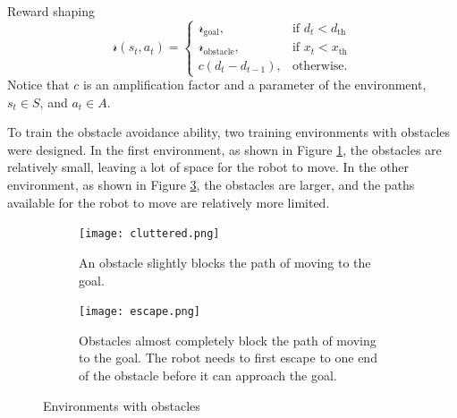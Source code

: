 {Reward shaping
\begin{equation*}
    \mathcal{r}(s_t, a_t) = \begin{cases}
    \mathcal{r}_\text{goal}, &\text{if $d_t < d_\text{th}$}\\
    \mathcal{r}_\text{obstacle}, &\text{if $x_t < x_\text{th}$}\\
    c (d_t - d_{t-1}), &\text{otherwise.}
    \end{cases}
\end{equation*}
Notice that $c$ is an amplification factor and a parameter of the environment, $s_t \in S$, and $a_t \in A$.

To train the obstacle avoidance ability, two training environments with obstacles were designed. In the first environment, as shown in Figure \ref{fig:cluttered}, the obstacles are relatively small, leaving a lot of space for the robot to move. In the other environment, as shown in Figure \ref{fig:escape}, the obstacles are larger, and the paths available for the robot to move are relatively more limited.

\begin{figure}[htbp]
\centering
\begin{subfigure}[b]{0.49\textwidth}
   \centering
   \texttt{[image: cluttered.png]}
   \caption{An obstacle slightly blocks the path of moving to the goal.}
   \label{fig:cluttered}
\end{subfigure}
\begin{subfigure}[b]{0.49\textwidth}
   \centering
   \texttt{[image: escape.png]}
   \caption{Obstacles almost completely block the path of moving to the goal. The robot needs to first escape to one end of the obstacle before it can approach the goal.}
   \label{fig:escape}
\end{subfigure}
\caption{Environments with obstacles}
\end{figure}

}
